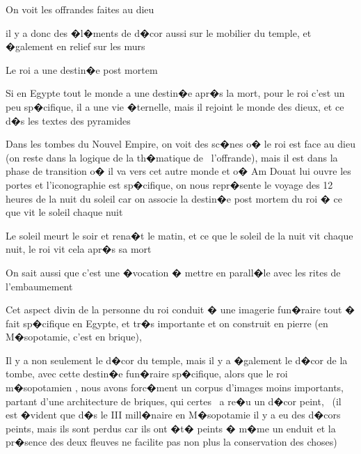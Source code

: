 \documentclass{article}
\begin{document}
On voit les offrandes faites au dieu


\bigskip


\bigskip

il y a donc des �l�ments de d�cor aussi sur le mobilier du temple, et �galement en relief sur les murs


\bigskip


\bigskip


\bigskip


\bigskip

Le roi a une destin�e post mortem


\bigskip


\bigskip

Si en Egypte tout le monde a une destin�e apr�s la mort, pour le roi c'est un peu sp�cifique, il a une vie �ternelle, mais il rejoint le monde des dieux, et ce d�s les textes des pyramides


\bigskip

Dans les tombes du Nouvel Empire, on voit des sc�nes o� le roi est face au dieu (on reste dans la logique de la th�matique de \ l'offrande), mais il est dans la phase de transition o� il va vers cet autre monde et o� Am Douat lui ouvre les portes et l'iconographie est sp�cifique, on nous repr�sente le voyage des 12 heures de la nuit du soleil car on associe la destin�e post mortem du roi � ce que vit le soleil chaque nuit

Le soleil meurt le soir et rena�t le matin, et ce que le soleil de la nuit vit chaque nuit, le roi vit cela apr�s sa mort

On sait aussi que c'est une �vocation � mettre en parall�le avec les rites de l'embaumement


\bigskip

Cet aspect divin de la personne du roi conduit � une imagerie fun�raire tout � fait sp�cifique en Egypte, et tr�s importante et on construit en pierre (en M�sopotamie, c'est en brique), 

Il y a non seulement le d�cor du temple, mais il y a �galement le d�cor de la tombe, avec cette destin�e fun�raire sp�cifique, alors que le roi m�sopotamien , nous avons forc�ment un corpus d'images moins importants, partant d'une architecture de briques, qui certes \ a re�u un d�cor peint, \ (il est �vident que d�s le III mill�naire en M�sopotamie il y a eu des d�cors peints, mais ils sont perdus car ils ont �t� peints � m�me un enduit et la pr�sence des deux fleuves ne facilite pas non plus la conservation des choses)


\bigskip
\end{document}
